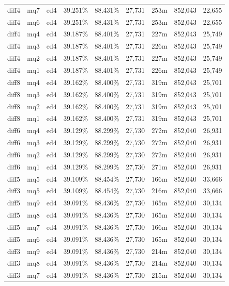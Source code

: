 \begin{landscape}
\begin{longtable}{|c|c|c||c|c||c|c|c|c|}
diff4 & mq7 & ed4 & 39.251\% & 88.431\% & 27,731 & 253m & 852,043 & 22,655 \\
diff4 & mq6 & ed4 & 39.251\% & 88.431\% & 27,731 & 253m & 852,043 & 22,655 \\
diff4 & mq4 & ed4 & 39.187\% & 88.401\% & 27,731 & 227m & 852,043 & 25,749 \\
diff4 & mq3 & ed4 & 39.187\% & 88.401\% & 27,731 & 226m & 852,043 & 25,749 \\
diff4 & mq2 & ed4 & 39.187\% & 88.401\% & 27,731 & 227m & 852,043 & 25,749 \\
diff4 & mq1 & ed4 & 39.187\% & 88.401\% & 27,731 & 226m & 852,043 & 25,749 \\
diff8 & mq4 & ed4 & 39.162\% & 88.400\% & 27,731 & 319m & 852,043 & 25,701 \\
diff8 & mq3 & ed4 & 39.162\% & 88.400\% & 27,731 & 319m & 852,043 & 25,701 \\
diff8 & mq2 & ed4 & 39.162\% & 88.400\% & 27,731 & 319m & 852,043 & 25,701 \\
diff8 & mq1 & ed4 & 39.162\% & 88.400\% & 27,731 & 319m & 852,043 & 25,701 \\
diff6 & mq4 & ed4 & 39.129\% & 88.299\% & 27,730 & 272m & 852,040 & 26,931 \\
diff6 & mq3 & ed4 & 39.129\% & 88.299\% & 27,730 & 272m & 852,040 & 26,931 \\
diff6 & mq2 & ed4 & 39.129\% & 88.299\% & 27,730 & 272m & 852,040 & 26,931 \\
diff6 & mq1 & ed4 & 39.129\% & 88.299\% & 27,730 & 271m & 852,040 & 26,931 \\
diff5 & mq5 & ed4 & 39.109\% & 88.454\% & 27,730 & 166m & 852,040 & 33,666 \\
diff3 & mq5 & ed4 & 39.109\% & 88.454\% & 27,730 & 216m & 852,040 & 33,666 \\
diff5 & mq9 & ed4 & 39.091\% & 88.436\% & 27,730 & 165m & 852,040 & 30,134 \\
diff5 & mq8 & ed4 & 39.091\% & 88.436\% & 27,730 & 165m & 852,040 & 30,134 \\
diff5 & mq7 & ed4 & 39.091\% & 88.436\% & 27,730 & 166m & 852,040 & 30,134 \\
diff5 & mq6 & ed4 & 39.091\% & 88.436\% & 27,730 & 165m & 852,040 & 30,134 \\
diff3 & mq9 & ed4 & 39.091\% & 88.436\% & 27,730 & 214m & 852,040 & 30,134 \\
diff3 & mq8 & ed4 & 39.091\% & 88.436\% & 27,730 & 214m & 852,040 & 30,134 \\
diff3 & mq7 & ed4 & 39.091\% & 88.436\% & 27,730 & 215m & 852,040 & 30,134 \\

\end{longtable}
\end{landscape}
